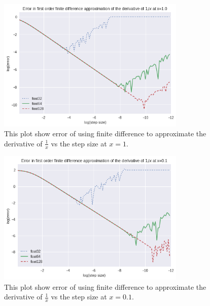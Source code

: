 \begin{figure}[hbt!]
    \centering
    \includegraphics[width=0.8\textwidth]{images/1_x_error_at_1.png}
    \caption{This plot show error of using finite difference to approximate the derivative of $\frac{1}{x}$ vs the step size at $x = 1$.}
    \label{fig:1/x_1}
\end{figure}

\begin{figure}[hbt!]
    \centering
    \includegraphics[width=0.8\textwidth]{images/1_x_error_at_p1.png}
    \caption{This plot show error of using finite difference to approximate the derivative of $\frac{1}{x}$ vs the step size at $x = 0.1$.}
    \label{fig:1/x_0.1}
\end{figure}


